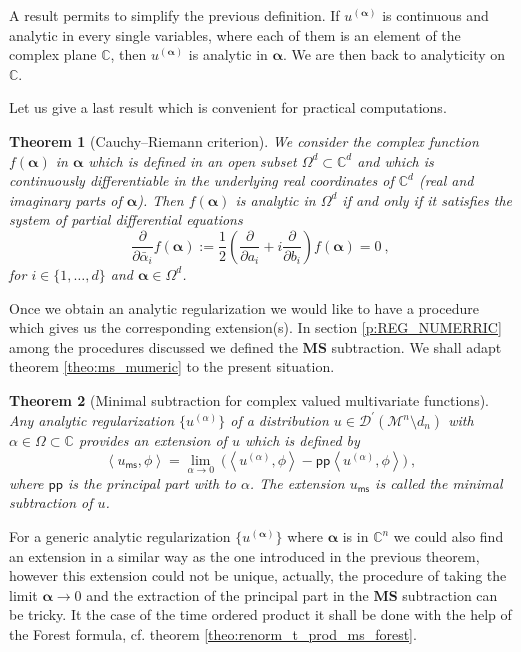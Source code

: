 \documentclass[11pt]{book}
\newcommand{\pp}{\mathsf{pp}}
\newcommand{\ms}{\mathsf{ms}}
\newcommand{\MS}{\textbf{MS}}
\newcommand{\alphabd}{\boldsymbol{\alpha}}
\newcommand{\sm}[1]{\left\langle#1\right\rangle}
\newcommand{\Dcal}{\mathcal{D}}
\newcommand{\Mcal}{\mathcal{M}}
\newcommand{\Cbb}{\mathbb{C}}
\theoremstyle{break}
\newtheorem{theorem}{Theorem}[chapter]
\begin{document}
A result permits to simplify the previous definition. If $u^{(\alphabd)}$ is continuous and analytic in every single variables, where each of them is an element of the complex plane $\Cbb$, then $u^{(\alphabd)}$ is analytic in $\alphabd$. We are then back to analyticity on $\Cbb$.


Let us give a last result which is convenient for practical computations. 


\begin{theorem}[Cauchy--Riemann criterion]
We consider the complex function $f(\alphabd)$ in $\alphabd$ which is defined in an open subset $\Omega^d \subset \Cbb^d$ and which is continuously differentiable in the underlying real coordinates of $\Cbb^d$ (real and imaginary parts of $\alphabd$). Then $f(\alphabd)$ is analytic in $\Omega^d$ if and only if it satisfies the system of partial differential equations
%
\begin{equation}
\frac{\partial}{\partial \bar{\alpha}_i} f(\alphabd) := \frac12 \left( \frac{\partial}{\partial a_i} + i \frac{\partial}{\partial b_i} \right) f(\alphabd) = 0 \ ,
\end{equation}
%
for $i\in\{1,\dots,d\}$ and $\alphabd\in\Omega^d$.
\end{theorem}


Once we obtain an analytic regularization we would like to have a procedure which gives us the corresponding extension(s). In section \ref{p:REG_NUMERRIC} among the procedures discussed we defined the $\MS$ subtraction. We shall adapt theorem \ref{theo:ms_mumeric} to the present situation.


\begin{theorem}[Minimal subtraction for complex valued multivariate functions]\label{theo:ms_general}
Any analytic regularization $\{u^{(\alpha)}\}$ of a distribution $u \in \Dcal^\prime(\Mcal^n\setminus d_n)$ with $\alpha\in\Omega\subset \Cbb$ provides an extension of $u$ which is defined by 
%
\begin{equation*}
\sm{u_\ms,\phi} = \lim_{\alpha \to 0} \ \bigg( \sm{u^{(\alpha)},\phi} - \pp\sm{u^{(\alpha)},\phi}\bigg) \ ,
\end{equation*}
%
where $\pp$ is the principal part with to $\alpha$. The extension $u_\ms$ is called the minimal subtraction of $u$.
\end{theorem}

For a generic analytic regularization $\{u^{(\alphabd)}\}$ where $\alphabd$ is in $\mathbb{C}^n$ we could also find an extension in a similar way as the one introduced in the previous theorem, however this extension could not be unique, actually, the procedure of taking the limit $\alphabd \to 0$ and the extraction of the principal part in the $\MS$ subtraction can be tricky. It the case of the time ordered product it shall be done with the help of the Forest formula, cf. theorem \ref{theo:renorm_t_prod_ms_forest}.
\end{document}
